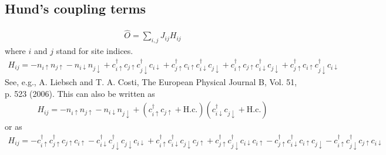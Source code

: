 \documentclass[letterpaper,10pt,english]{sphinxmanual}
\begin{document}
\subsection{Hund’s coupling terms}
\label{\detokenize{models:hund-s-coupling-terms}}\begin{equation*}
\begin{split}\hat O = \sum_{i,j} J_{ij} H_{ij}\end{split}
\end{equation*}
\sphinxAtStartPar
where \(i\) and \(j\) stand for site indices.
\begin{equation*}
\begin{split}H_{ij} = -n_{i\uparrow}n_{j\uparrow} - n_{i\downarrow}n_{j\downarrow} + c^\dagger_{i\uparrow}c_{j\uparrow}c^\dagger_{j\downarrow}c_{i\downarrow}
+ c^\dagger_{j\uparrow}c_{i\uparrow}c^\dagger_{i\downarrow}c_{j\downarrow}
+ c^\dagger_{i\uparrow}c_{j\uparrow}c^\dagger_{i\downarrow}c_{j\downarrow}
+ c^\dagger_{j\uparrow}c_{i\uparrow}c^\dagger_{j\downarrow}c_{i\downarrow}\end{split}
\end{equation*}
\sphinxAtStartPar
See, e.g., A. Liebsch and  T. A. Costi, The European Physical Journal B, Vol. 51, p. 523 (2006).
This can also be written as
\begin{equation*}
\begin{split}H_{ij} = -n_{i\uparrow}n_{j\uparrow} - n_{i\downarrow}n_{j\downarrow}
+ (c^\dagger_{i\uparrow}c_{j\uparrow}+\mathrm{H.c.})(c^\dagger_{i\downarrow}c_{j\downarrow}+ \mathrm{H.c.})\end{split}
\end{equation*}
\sphinxAtStartPar
or as
\begin{equation*}
\begin{split}H_{ij} = -c^\dagger_{i\uparrow}c^\dagger_{j\uparrow}c_{j\uparrow}c_{i\uparrow} - c^\dagger_{i\downarrow}c^\dagger_{j\downarrow}c_{j\downarrow}c_{i\downarrow}
+ c^\dagger_{i\uparrow}c^\dagger_{i\downarrow}c_{j\downarrow}c_{j\uparrow}
+ c^\dagger_{j\uparrow}c^\dagger_{j\downarrow}c_{i\downarrow}c_{i\uparrow}
- c^\dagger_{j\uparrow}c^\dagger_{i\downarrow}c_{i\uparrow}c_{j\downarrow}
- c^\dagger_{i\uparrow}c^\dagger_{j\downarrow}c_{j\uparrow}c_{i\downarrow}\end{split}
\end{equation*}
\end{document}
